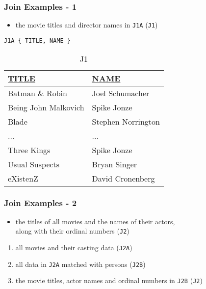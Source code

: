 \documentclass[dvipsnames]{beamer}
\theoremstyle{plain}
\begin{document}
\begin{frame}[fragile]
  \frametitle{Join Examples - 1}

  \begin{example}
    \begin{itemize}
      \item the movie titles and director names in \texttt{J1A}
        (\texttt{J1})
    \end{itemize}

    \begin{lstlisting}
J1A { TITLE, NAME }
    \end{lstlisting}

    \pause
    \vspace{-10pt}
    \begin{tiny}
    \begin{table}
      \caption{J1}
      \begin{tabular}{|l|l|}\hline
\underline{TITLE}    & \underline{NAME}\\[2pt]\hline\hline
Batman \& Robin      & Joel Schumacher \\\hline
Being John Malkovich & Spike Jonze     \\\hline
Blade                & Stephen Norrington\\\hline
...                  & ...             \\\hline
Three Kings          & Spike Jonze     \\\hline
Usual Suspects       & Bryan Singer    \\\hline
eXistenZ             & David Cronenberg\\\hline
      \end{tabular}
    \end{table}
    \end{tiny}
  \end{example}
\end{frame}

\begin{frame}
  \frametitle{Join Examples - 2}

  \begin{example}
    \begin{itemize}
      \item the titles of all movies and the names of their actors,\\
        along with their ordinal numbers (\texttt{J2})
    \end{itemize}

    \pause
    \begin{enumerate}
      \item all movies and their casting data (\texttt{J2A})

      \pause
      \item all data in \texttt{J2A} matched with persons (\texttt{J2B})

      \pause
      \item the movie titles, actor names and ordinal numbers in \texttt{J2B}
        (\texttt{J2})
    \end{enumerate}
  \end{example}
\end{frame}
\end{document}
